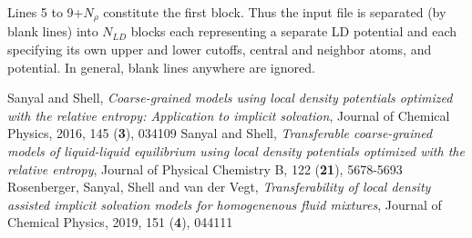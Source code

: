 \documentclass[12pt,a4paper]{article}
\begin{document}
\noindent Lines 5 to 9+$N_\rho$ constitute the first block. Thus the input file is separated (by blank lines) into $N_{LD}$ blocks each representing a separate LD potential and each specifying its own upper and lower cutoffs, central and neighbor atoms, and potential.  In general, blank lines anywhere are ignored. 
%
%
%
\begin{thebibliography}{9}
%
Sanyal and Shell, \emph{Coarse-grained models using local density potentials optimized with the relative entropy: Application to implicit solvation}, Journal of Chemical Physics, 2016, 145 (\textbf{3}), 034109
Sanyal and Shell, \emph{Transferable coarse-grained models of liquid-liquid equilibrium using local density potentials optimized with the relative entropy}, Journal of Physical Chemistry B, 122 (\textbf{21}), 5678-5693
Rosenberger, Sanyal, Shell and van der Vegt, \emph{Transferability of local density assisted implicit solvation models for homogenenous fluid mixtures}, Journal of Chemical Physics, 2019, 151 (\textbf{4}), 044111
%
\end{thebibliography}
%
\end{document}
